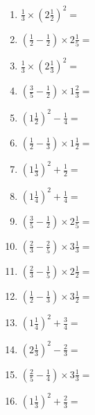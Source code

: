 \documentclass[12pt]{article}
\begin{document}
\begin{enumerate}
\item \large $ \frac{1}{3} \times \left( 2 \frac{1}{2} \right)^2 = $ \vspace{1.6cm}
\item \large $ \left( \frac{1}{2} - \frac{1}{2} \right) \times 2 \frac{1}{5} = $ \vspace{1.6cm}
\item \large $ \frac{1}{3} \times \left( 2 \frac{1}{3} \right)^2 = $ \vspace{1.6cm}
\item \large $ \left( \frac{3}{5} - \frac{1}{2} \right) \times 1 \frac{2}{3} = $ \vspace{1.6cm}
\item \large $ \left( 1 \frac{1}{2} \right)^2 - \frac{1}{4} = $ \vspace{1.6cm}
\item \large $ \left( \frac{1}{2} - \frac{1}{3} \right) \times 1 \frac{1}{2} = $ \vspace{1.6cm}
\item \large $ \left( 1 \frac{1}{3} \right)^2 + \frac{1}{2} = $ \vspace{1.6cm}
\item \large $ \left( 1 \frac{1}{4} \right)^2 + \frac{1}{4} = $ \vspace{1.6cm}
\item \large $ \left( \frac{3}{5} - \frac{1}{2} \right) \times 2 \frac{1}{5} = $ \vspace{1.6cm}
\item \large $ \left( \frac{2}{3} - \frac{2}{5} \right) \times 3 \frac{1}{3} = $ \vspace{1.6cm}
\newpage
\item \large $ \left( \frac{2}{3} - \frac{1}{5} \right) \times 2 \frac{1}{2} = $ \vspace{1.6cm}
\item \large $ \left( \frac{1}{2} - \frac{1}{3} \right) \times 3 \frac{1}{2} = $ \vspace{1.6cm}
\item \large $ \left( 1 \frac{1}{4} \right)^2 + \frac{3}{4} = $ \vspace{1.6cm}
\item \large $ \left( 2 \frac{1}{3} \right)^2 - \frac{2}{3} = $ \vspace{1.6cm}
\item \large $ \left( \frac{2}{5} - \frac{1}{4} \right) \times 3 \frac{1}{3} = $ \vspace{1.6cm}
\item \large $ \left( 1 \frac{1}{3} \right)^2 + \frac{2}{3} = $ \vspace{1.6cm}

\end{enumerate}
\end{document}
